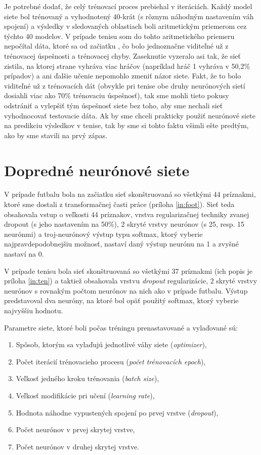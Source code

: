 Je potrebné dodať, že celý trénovací proces prebiehal v iteráciách.
Každý model siete bol trénovaný a vyhodnotený 40-krát (s rôznym náhodným nastavením váh spojení) a výsledky v sledovaných oblastiach boli aritmetickým priemerom cez týchto 40 modelov.
V prípade tenisu som do tohto aritmetického priemeru nepočítal dáta, ktoré sa od začiatku , čo bolo jednoznačne viditeľné už z trénovacej úspešnosti a trénovacej chyby. 
Zaseknutie vyzeralo asi tak, že sieť zistila, na ktorej strane vyhráva viac hráčov (napríklad hráč 1 vyhráva v 50,2\% prípadov) a ani ďalšie učenie nepomohlo zmeniť názor siete. 
Fakt, že to bolo viditeľné už z trénovacích dát (obvykle pri tenise obe druhy neurónových sietí dosiahli viac ako 70\% trénovaciu úspešnosť), tak sme mohli tieto pokusy odstrániť a vylepšiť tým úspešnosť siete bez toho, aby sme nechali sieť vyhodnocovať testovacie dáta.
Ak by sme chceli prakticky použiť neurónové siete na predikciu výsledkov v tenise, tak by sme si tohto faktu všimli ešte predtým, ako by sme stavili na prvý zápas.

\section{Dopredné neurónové siete} \label{ffnn:train}
V prípade futbalu bola na začiatku sieť skonštruovaná so všetkými 44 príznakmi, ktoré sme dostali z transformačnej časti práce (príloha \ref{in:foot}).
Sieť teda obsahovala vstup o veľkosti 44 príznakov, vrstva regularizačnej techniky zvanej dropout (s jeho nastavením na 50\%), 2 skryté vrstvy neurónov (s 25, resp. 15 neurónmi) a troj-neurónový výstup typu softmax, ktorý vyberie najpravdepodobnejšiu možnosť, nastaví daný výstup neurónu na 1 a zvyšné nastaví na 0.

V prípade tenisu bola sieť skonštruovaná so všetkými 37 príznakmi (ich popis je príloha \ref{in:ten}) a taktiež obsahovala vrstvu \textit{dropout} regularizácie, 2 skryté vrstvy neurónov s rovnakým počtom neurónov na nich ako v prípade futbalu. 
Výstup predstavoval dva neuróny, na ktoré bol opäť použitý softmax, ktorý vyberie najvyššiu hodnotu.

Parametre siete, ktoré boli počas tréningu prenastavované a vylaďované sú:
\begin{enumerate}
  \item Spôsob, ktorým sa vylaďujú jednotlivé váhy siete (\textit{optimizer}),
  \item Počet iterácií trénovacieho procesu (\textit{počet trénovacích epoch}),
  \item Veľkosť jedného kroku trénovania (\textit{batch size}),
  \item Veľkosť modifikácie pri učení (\textit{learning rate}),
  \item Hodnota náhodne vypustených spojení po prvej vrstve (\textit{dropout}),
  \item Počet neurónov v prvej skrytej vrstve,
  \item Počet neurónov v druhej skrytej vrstve.
\end{enumerate}

